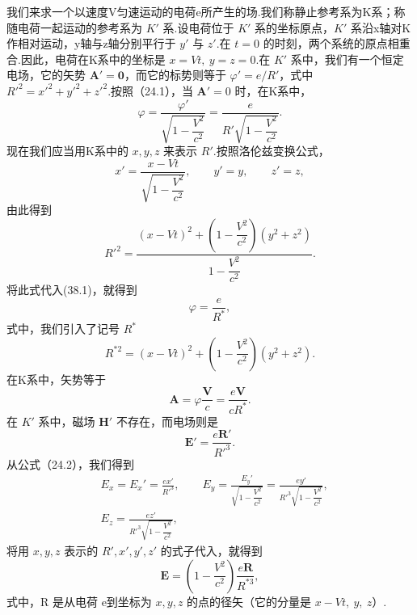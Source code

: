 我们来求一个以速度V匀速运动的电荷e所产生的场.我们称静止参考系为K系；称随电荷一起运动的参考系为 $K'$ 系.设电荷位于 $K'$ 系的坐标原点，$K'$ 系沿x轴对K作相对运动，y轴与z轴分别平行于 $y'$ 与 $z'$.在 $t = 0$ 的时刻，两个系统的原点相重合.因此，电荷在K系中的坐标是 $x = Vt,\ y = z = 0$.在 $K'$ 系中，我们有一个恒定电场，它的矢势 $\boldsymbol{A}'=\boldsymbol{0}$，而它的标势则等于 $\varphi' = e/R'$，式中 $R'^2 = x'^2 + y'^2 + z'^2$.按照（24.1），当 $\boldsymbol{A}'=0$ 时，在K系中，
\begin{equation}
  \varphi=\frac{\varphi'}{\sqrt{1-\dfrac{V^2}{c^2}}}
  =\frac{e}{R'\sqrt{1-\dfrac{V^2}{c^2}}}.
\end{equation}
现在我们应当用K系中的 $x,y,z$ 来表示 $R'$.按照洛伦兹变换公式，
\begin{equation*}
  x'=\frac{x-Vt}{\sqrt{1-\dfrac{V^2}{c^2}}},\qquad
  y'=y,\qquad z'=z,
\end{equation*}
由此得到
\begin{equation}
  R'^2=\frac{(x-Vt)^2+\left(1-\dfrac{V^2}{c^2}\right)(y^2+z^2)}{1-\dfrac{V^2}{c^2}}.
\end{equation}
将此式代入(38.1)，就得到
\begin{equation}
  \varphi=\frac{e}{R^*},
\end{equation}
式中，我们引入了记号 $R^*$
\begin{equation}
  R^{*2}=(x-Vt)^2+\left(1-\frac{V^2}{c^2}\right)(y^2+z^2).
\end{equation}
在K系中，矢势等于
\begin{equation}
  \boldsymbol{A}=\varphi\frac{\boldsymbol{V}}{c}=\frac{e\boldsymbol{V}}{cR^*}.
\end{equation}
在 $K'$ 系中，磁场 $\boldsymbol{H}'$ 不存在，而电场则是
\begin{equation*}
  \boldsymbol{E}'=\frac{e\boldsymbol{R}'}{R'^3}.
\end{equation*}
从公式（24.2），我们得到
\begin{equation*}
\begin{aligned}
  &E_x=E_x'=\frac{ex'}{R'^3},\qquad
  E_y=\frac{E_y'}{\sqrt{1-\dfrac{V^2}{c^2}}}
  =\frac{ey'}{R'^3\sqrt{1-\dfrac{V^2}{c^2}}},\\
  &E_z=\frac{ez'}{R'^3\sqrt{1-\dfrac{V^2}{c^2}}},
\end{aligned}
\end{equation*}
将用 $x,y,z$ 表示的 $R',x',y',z'$ 的式子代入，就得到
\begin{equation}
  \boldsymbol{E}=\left(1-\frac{V^2}{c^2}\right)\frac{e\boldsymbol{R}}{R^{*3}},
\end{equation}
式中，R 是从电荷 e到坐标为 $x,y,z$ 的点的径矢（它的分量是 $x-Vt,\ y,\ z$）.

